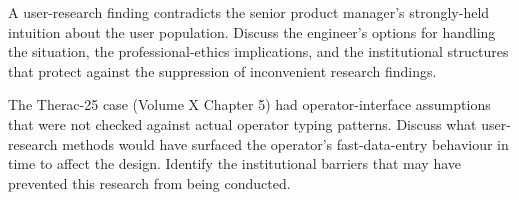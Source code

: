 \begin{exercise}
A user-research finding contradicts the senior product manager's strongly-held intuition about the user population. Discuss the engineer's options for handling the situation, the professional-ethics implications, and the institutional structures that protect against the suppression of inconvenient research findings.
\end{exercise}

\begin{exercise}
The Therac-25 case (Volume X Chapter 5) had operator-interface assumptions that were not checked against actual operator typing patterns. Discuss what user-research methods would have surfaced the operator's fast-data-entry behaviour in time to affect the design. Identify the institutional barriers that may have prevented this research from being conducted.
\end{exercise}
